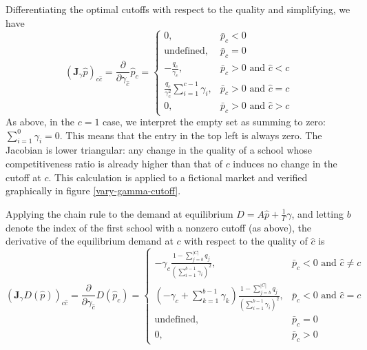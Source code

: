\documentclass[12pt]{article}
\theoremstyle{definition}
\begin{document}
Differentiating the optimal cutoffs with respect to the quality and simplifying, we have
\begin{equation}\label{jac-gamma-p}
\left(\mathbf{J}_\gamma \hat p\right)_{c\hat c} =
\frac{\partial}{\partial\gamma_{\hat c}} \hat p_c = \begin{cases}
0, & \bar p_c < 0 \\
\text{undefined}, & \bar p_c = 0 \\
 - \frac{q_c}{\gamma_c}, & \bar p_c > 0 \text{ and }\hat c < c \\
\frac{q_c}{\gamma_c^2} \sum_{i=1}^{c-1} \gamma_i, & \bar p_c > 0 \text{ and }\hat c = c\\
0, & \bar p_c > 0 \text{ and }\hat c > c
\end{cases}
\end{equation}
As above, in the $c=1$ case, we interpret the empty set as summing to zero: $\sum_{i=1}^{0} \gamma_i = 0$. This means that the entry in the top left is always zero. The Jacobian is lower triangular: any change in the quality of a school whose competitiveness ratio is already higher than that of $c$ induces no change in the cutoff at $c$. This calculation is applied to a fictional market and verified graphically in figure \ref{vary-gamma-cutoff}.

Applying the chain rule to the demand at equilibrium $D = A \hat p + \frac{1}{\Gamma} \gamma$, and letting $b$ denote the index of the first school with a nonzero cutoff (as above), the derivative of the equilibrium demand at $c$ with respect to the quality of $\hat c$ is
\begin{equation} \label{jac-gamma-demand}
\left(\mathbf{J}_\gamma D\left(\hat p\right)\right)_{c\hat c} =
\frac{\partial}{\partial\gamma_{\hat c}} D(\hat p_c) = \begin{cases}
-\gamma_c \frac{1 - \sum_{j=b}^{|C|} q_j}{\left(\sum_{i=1}^{b-1} \gamma_i\right)^2}, & \bar p_c < 0 \text{ and }\hat c \neq c \\
\left(- \gamma_c + \sum_{k=1}^{b-1} \gamma_k\right)\frac{1 - \sum_{j=b}^{|C|} q_j}{\left(\sum_{i=1}^{b-1} \gamma_i\right)^2}, & \bar p_c < 0 \text{ and }\hat c = c\\
\text{undefined}, & \bar p_c = 0 \\
0, & \bar p_c > 0
\end{cases}
\end{equation}
\end{document}
